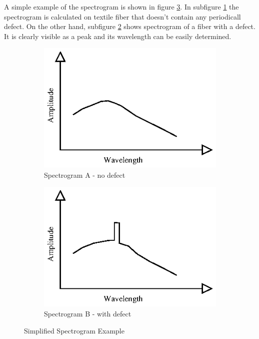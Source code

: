 \documentclass[twoside]{ctuthesis}
\theoremstyle{plain}
\theoremstyle{definition}
\theoremstyle{note}
\begin{document}
A simple example of the spectrogram is shown in figure \ref{fig:specExpl}. In subfigure \ref{fig:specExpl_A} the spectrogram is calculated on textile fiber that doesn't contain any periodicall defect. On the other hand, subfigure \ref{fig:specExpl_B} shows spectrogram of a fiber with a defect. It is clearly visible as a peak and its wavelength can be easily determined.
\begin{figure}
	\centering
	\begin{subfigure}{0.5\textwidth}
		\centering
		\includegraphics[width=1.0\linewidth]{spectrogram_good.eps}
		\caption{Spectrogram A - no defect}
		\label{fig:specExpl_A}
	\end{subfigure}%
	\begin{subfigure}{0.5\textwidth}
		\centering
		\includegraphics[width=1.0\linewidth]{spectrogram_bad.eps}
		\caption{Spectrogram B - with defect}
		\label{fig:specExpl_B}
	\end{subfigure}
	\caption{Simplified Spectrogram Example}
	\label{fig:specExpl}
\end{figure}
\end{document}
